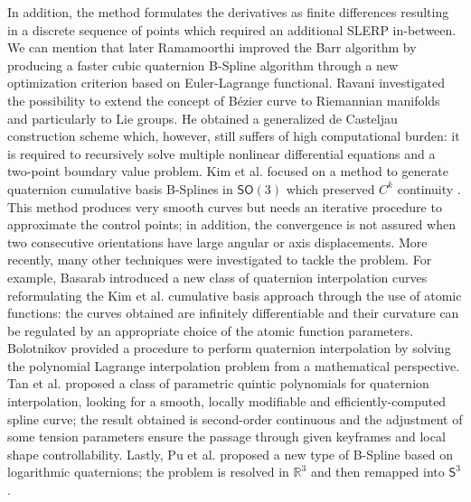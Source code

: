 In addition, the method formulates the derivatives as finite differences resulting in a discrete sequence of points which required an additional SLERP in-between. We can mention that later Ramamoorthi \cite{ramamoorthi1997fast} improved the Barr algorithm \cite{barr1992smooth} by producing a faster cubic quaternion B-Spline algorithm through a new optimization criterion based on Euler-Lagrange functional. Ravani \cite{ravani1995bezier} investigated the possibility to extend the concept of B\'ezier curve to Riemannian manifolds and particularly to Lie groups. He obtained a generalized de Casteljau construction scheme which, however, still suffers of high computational burden: it is required to recursively solve multiple nonlinear differential equations and a two-point boundary value problem. Kim et al. focused on a method to generate quaternion cumulative basis B-Splines in $\mathsf{SO}(3)$ which preserved $C^{k}$ continuity \cite{kim1995ac} \cite{kim1995general}. This method produces very smooth curves but needs an iterative procedure to approximate the control points; in addition, the convergence is not assured when two consecutive orientations have large angular or axis displacements. More recently, many other techniques were investigated to tackle the problem. For example, Basarab \cite{basarab2010interpolating} introduced a new class of quaternion interpolation curves reformulating the Kim et al. cumulative basis approach through the use of atomic functions: the curves obtained are infinitely differentiable and their curvature can be regulated by an appropriate choice of the atomic function parameters. Bolotnikov \cite{bolotnikov2015polynomial} provided a procedure to perform quaternion interpolation by solving the polynomial Lagrange interpolation problem from a mathematical perspective. Tan et al. \cite{tan2018smooth} proposed a class of parametric quintic polynomials for quaternion interpolation, looking for a smooth, locally modifiable and efficiently-computed spline curve; the result obtained is second-order continuous and the adjustment of some tension parameters ensure the passage through given keyframes and local shape controllability. Lastly, Pu et al. \cite{pu2020c2} proposed a new type of B-Spline based on logarithmic quaternions; the problem is resolved in $\mathbb{R}^{3}$ and then remapped into $\mathsf{S}^3$.

